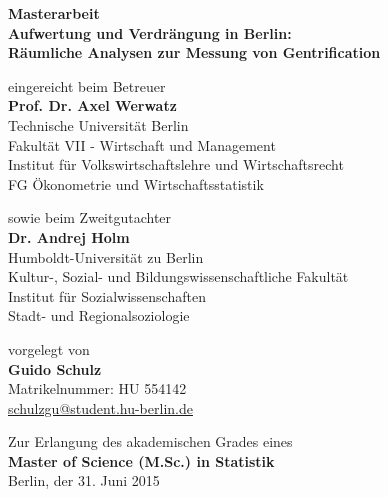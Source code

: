 \begin{center}
    {\normalsize{\bf Masterarbeit}} \\\vspace{0.5cm}
    {\Large{\bf Aufwertung und Verdrängung in Berlin: \\
                Räumliche Analysen zur Messung von Gentrification}} \vspace{1.0cm}

    {\normalsize eingereicht beim Betreuer}\\\vspace{0.5cm}
    {\normalsize{\bf Prof. Dr. Axel Werwatz}} \\\vspace{0.5cm}
    {\normalsize Technische Universität Berlin \\
    Fakultät VII - Wirtschaft und Management \\
    Institut für Volkswirtschaftslehre und Wirtschaftsrecht \\
    FG Ökonometrie und Wirtschaftsstatistik} \vspace{1cm}

    {\normalsize sowie beim Zweitgutachter}\\\vspace{0.5cm}
    {\normalsize{\bf Dr. Andrej Holm}} \\\vspace{0.5cm}
    {\normalsize Humboldt-Universität zu Berlin \\
    Kultur-, Sozial- und Bildungswissenschaftliche Fakultät\\
    Institut für Sozialwissenschaften\\
    Stadt- und Regionalsoziologie} \vspace{1cm}

    {\normalsize vorgelegt von \\\vspace{0.5cm}
    {\bf Guido Schulz} \\
    Matrikelnummer: HU 554142 \\
    \href{mailto:schulzgu@student.hu-berlin.de}{schulzgu@student.hu-berlin.de}} \vspace{1cm}


    {\normalsize Zur Erlangung des akademischen Grades eines \\
    {\bf Master of Science (M.Sc.) in Statistik} \\
    Berlin, der 31. Juni 2015}

\end{center}
